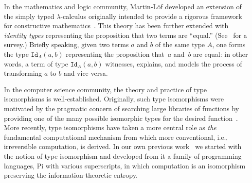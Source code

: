 \documentclass{llncs}
\newcommand{\roshan}[1]{}
\begin{document}
In the mathematics and logic community, Martin-L\"of developed an extension
of the simply typed $\lambda$-calculus originally intended to provide a
rigorous framework for constructive
mathematics~\cite{citeulike:7374951}. This theory has been further extended
with \emph{identity types} representing the proposition that two terms are
``equal.'' (See~\cite{streicher,warren} for a survey.) Briefly speaking,
given two terms $a$ and $b$ of the same type $A$, one forms the type
$\texttt{Id}_A(a,b)$ representing the proposition that~$a$ and~$b$ are equal:
in other words, a term of type $\texttt{Id}_A(a,b)$ witnesses, explains, and
models the process of transforming $a$ to $b$ and vice-versa.

\roshan{The above para is too technical in a weird way. Its unclear
  what it contributes. If one wants to make a point of computational
  witnesses of isomorphisms its easier to explain and cite in terms of
  Andreas Blass and Fiore -- and more generally by Barry Mazur. I say
  this also because it seems that HOTT is more concerned with
  topological structure of equalities, even though they tend to start
  their literature with some talk of intentional specifications.}


In the computer science community, the theory and practice of type
isomorphisms is well-established. Originally, such type isomorphisms were
motivated by the pragmatic concern of searching large libraries of functions
by providing one of the many possible isomorphic types for the desired
function~\cite{Rittri:1989:UTS:99370.99384}. More recently, type isomorphisms
have taken a more central role as \emph{the} fundamental computational
mechanism from which more conventional, i.e., irreversible computation, is
derived. In our own previous
work~\cite{James:2012:IE:2103656.2103667,rc2011,rc2012} we started with the
notion of type isomorphism and developed from it a family of programming
languages, {{Pi}} with various superscripts, in which computation is an
isomorphism preserving the information-theoretic entropy.
\end{document}
